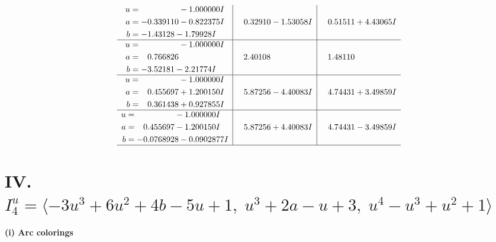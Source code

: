 \documentclass[1p]{elsarticle_modified}
\theoremstyle{definition}
\begin{document}
$$\begin{array}{c|c|c}
\begin{aligned}
u &= \phantom{-0.000000 } -1.000000 I \\
a &= -0.339110 - 0.822375 I \\
b &= -1.43128 - 1.79928 I\end{aligned}
 & \phantom{-}0.32910 - 1.53058 I & \phantom{-}0.51511 + 4.43065 I \\ \hline\begin{aligned}
u &= \phantom{-0.000000 } -1.000000 I \\
a &= \phantom{-}0.766826\phantom{ +0.000000I} \\
b &= -3.52181 - 2.21774 I\end{aligned}
 & \phantom{-}2.40108\phantom{ +0.000000I} & \phantom{-}1.48110\phantom{ +0.000000I} \\ \hline\begin{aligned}
u &= \phantom{-0.000000 } -1.000000 I \\
a &= \phantom{-}0.455697 + 1.200150 I \\
b &= \phantom{-}0.361438 + 0.927855 I\end{aligned}
 & \phantom{-}5.87256 - 4.40083 I & \phantom{-}4.74431 + 3.49859 I \\ \hline\begin{aligned}
u &= \phantom{-0.000000 } -1.000000 I \\
a &= \phantom{-}0.455697 - 1.200150 I \\
b &= -0.0768928 - 0.0902877 I\end{aligned}
 & \phantom{-}5.87256 + 4.40083 I & \phantom{-}4.74431 - 3.49859 I\\
 \hline 
 \end{array}$$\newpage\newpage\renewcommand{\arraystretch}{1}
\centering \section*{IV. $I^u_{4}= \langle -3 u^3+6 u^2+4 b-5 u+1,\;u^3+2 a- u+3,\;u^4- u^3+u^2+1 \rangle$}
\flushleft \textbf{(i) Arc colorings}\\
\end{document}
